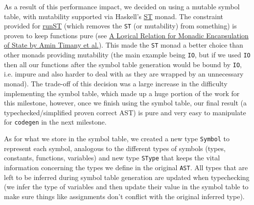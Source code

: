 \documentclass[11pt]{article}
\begin{document}
As a result of this performance impact, we decided on using a
mutable symbol table, with mutability supported via Haskell's \href{https://hackage.haskell.org/package/base-4.12.0.0/docs/Control-Monad-ST.html}{ST}
monad. The constraint provided for \href{https://hackage.haskell.org/package/base-4.12.0.0/docs/Control-Monad-ST.html\#v:runST}{runST} (which removes the \texttt{ST} (or
mutability) from something) is proven to keep functions pure (see
\href{https://iris-project.org/pdfs/2018-popl-runST-final.pdf}{A Logical
Relation for Monadic Encapsulation of State by Amin Timany et
al.}). This made the \texttt{ST} monad a better choice than other monads
providing mutability (the main example being \texttt{IO}, but if we used
\texttt{IO} then all our functions after the symbol table generation would
be bound by \texttt{IO}, i.e. impure and also harder to deal with as they
are wrapped by an unnecessary monad). The trade-off of this decision
was a large increase in the difficulty implementing the symbol
table, which made up a huge portion of the work for this milestone,
however, once we finish using the symbol table, our final result (a
typechecked/simplified proven correct AST) is pure and very easy to
manipulate for \texttt{codegen} in the next milestone.

As for what we store in the symbol table, we created a new type
\texttt{Symbol} to represent each symbol, analogous to the different types
of symbols (types, constants, functions, variables) and new type
\texttt{SType} that keeps the vital information concerning the types we
define in the original \texttt{AST}. All types that are left to be inferred
during symbol table generation are updated when typechecking (we
infer the type of variables and then update their value in the
symbol table to make sure things like assignments don't conflict
with the original inferred type).
\end{document}
